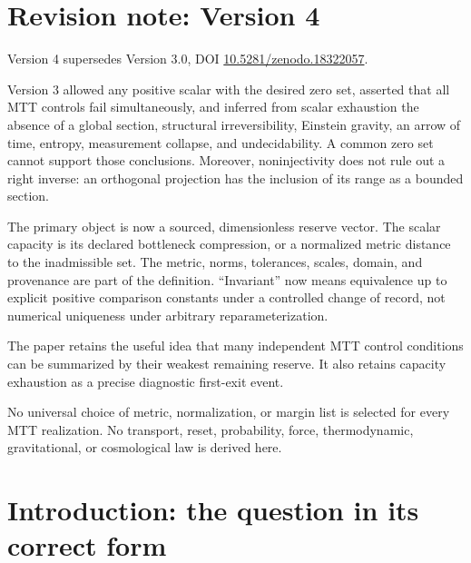 \documentclass[11pt]{article}
\theoremstyle{definition}
\theoremstyle{remark}
\begin{document}
\section*{Revision note: Version 4}
\begin{description}[leftmargin=2.5cm,style=nextline]
\item[Supersedes]
Version 4 supersedes Version 3.0, DOI
\href{https://doi.org/10.5281/zenodo.18322057}
{10.5281/zenodo.18322057}.

\item[Reason]
Version 3 allowed any positive scalar with the desired zero set, asserted
that all MTT controls fail simultaneously, and inferred from scalar
exhaustion the absence of a global section, structural irreversibility,
Einstein gravity, an arrow of time, entropy, measurement collapse, and
undecidability.  A common zero set cannot support those conclusions.
Moreover, noninjectivity does not rule out a right inverse: an orthogonal
projection has the inclusion of its range as a bounded section.

\item[Resolution]
The primary object is now a sourced, dimensionless reserve vector.
The scalar capacity is its declared bottleneck compression, or a normalized
metric distance to the inadmissible set.  The metric, norms, tolerances,
scales, domain, and provenance are part of the definition.  ``Invariant''
now means equivalence up to explicit positive comparison constants under a
controlled change of record, not numerical uniqueness under arbitrary
reparameterization.

\item[Retained content]
The paper retains the useful idea that many independent MTT control
conditions can be summarized by their weakest remaining reserve.  It also
retains capacity exhaustion as a precise diagnostic first-exit event.

\item[Remaining boundary]
No universal choice of metric, normalization, or margin list is selected
for every MTT realization.  No transport, reset, probability, force,
thermodynamic, gravitational, or cosmological law is derived here.
\end{description}

\tableofcontents

\section{Introduction: the question in its correct form}
\label{sec:question}
\end{document}
